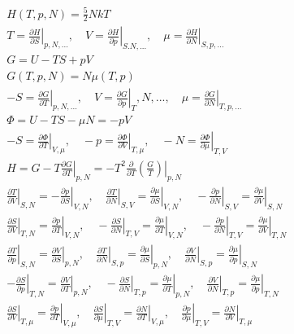 \documentclass[10pt]{article}
\newcommand{\pder}[2]{\frac{\partial #1}{\partial #2}}
\newcommand{\lrp}[1]{\left( #1 \right)}
\newcommand{\evalb}[1]{\left. #1 \right|}
\begin{document}
\begin{multicols}{2}
\begin{align*}
		& H(T,p,N) = \frac{5}{2} NkT	\tag*{Enthalpy of an ideal gas (GNS 4.78)} \\
		& T =  \evalb{\pder{H}{S}}_{p,N,...}, \quad V = \evalb{\pder{H}{p}}_{S.N,...}, \quad \mu = \evalb{\pder{H}{N}}_{S,p,...}	\tag*{State quantities from enthalpy (GNS 4.61)} \\	
		& G = U - TS + pV	\tag*{Free enthalpy [Gibbs' potential] (GNS 4.81)} \\
		& G(T,p,N) = N \mu(T,p)	\tag*{Free enthalpy of the ideal gas (GNS Ex. 4.10)} \\
		& -S = \evalb{\pder{G}{T}}_{p,N,...}, \quad V = \evalb{\pder{G}{p}}_T,N,..., \quad \mu = \evalb{\pder{G}{N}}_{T,p,...}	\tag*{State quantities from Gibbs' potential (GNS 4.83)} \\
		& \Phi = U -TS - \mu N = -pV	\tag*{Defintion of the grand potential (GNS 4.111,4.115)} \\
		& -S = \evalb{\pder{\Phi}{T}}_{V,\mu}, \quad -p = \evalb{\pder{\Phi}{V}}_{T,\mu}, \quad -N = \evalb{\pder{\Phi}{\mu}}_{T,V}	\tag*{State quantities from grand potential (GNS 4.113)} \\
		& H = G- T \evalb{\pder{G}{T}}_{p,N} = -T^2 \pder{}{T} \evalb{\lrp{\frac{G}{T}}}_{p,N}	\tag*{Gibbs-Helmholtz equation (GNS 4.94)} \\
		& \evalb{\pder{T}{V}}_{S,N} = - \evalb{\pder{p}{S}}_{V,N}, \quad \evalb{\pder{T}{N}}_{S,V} = \evalb{\pder{\mu}{S}}_{V,N}, \quad -\evalb{\pder{p}{N}}_{S,V} = \evalb{\pder{\mu}{V}}_{S,N}	\tag*{Maxwell relations following from potential energy (GNS 4.127)} \\
		& \evalb{\pder{S}{V}}_{T,N} = \evalb{\pder{p}{T}}_{V,N}, \quad -\evalb{\pder{S}{N}}_{T,V} = \evalb{\pder{\mu}{T}}_{V,N}, \quad -\evalb{\pder{p}{N}}_{T,V} = \evalb{\pder{\mu}{V}}_{T,N} \tag*{Maxwell relations following from the free energy (GNS 4.129)} \\
		& \evalb{\pder{T}{p}}_{S,N} = \evalb{\pder{V}{S}}_{p,N}, \quad \evalb{\pder{T}{N}}_{S,p} = \evalb{\pder{\mu}{S}}_{p,N}, \quad \evalb{\pder{V}{N}}_{S,p} = \evalb{\pder{\mu}{p}}_{S,N}	\tag*{Maxwell relations following from the enthalpy (GNS 4.131)} \\
		& -\evalb{\pder{S}{p}}_{T,N} = \evalb{\pder{V}{T}}_{p,N}, \quad -\evalb{\pder{S}{N}}_{T,p} = \evalb{\pder{\mu}{T}}_{p,N}, \quad \evalb{\pder{V}{N}}_{T,p} = \evalb{\pder{\mu}{p}}_{T,N} 	\tag*{Maxwell relations following from the free enthalpy (GNS 4.133)} \\
		& \evalb{\pder{S}{V}}_{T,\mu}=\evalb{\pder{p}{T}}_{V,\mu}, \quad \evalb{\pder{S}{\mu}}_{T,V} = \evalb{\pder{N}{T}}_{V,\mu}, \quad \evalb{\pder{p}{\mu}}_{T,V} = \evalb{\pder{N}{V}}_{T,\mu}		\tag*{Maxwell relations following from the grand potential (GNS 4.135)} \\

\end{align*}
\end{multicols}
\end{document}
